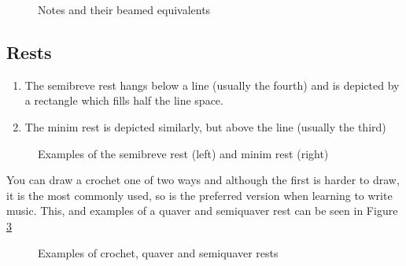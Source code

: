\begin{figure}[h!]
  \centering
  \caption{Notes and their beamed equivalents}
  \label{fig:RestCrochetQS}
\end{figure}


\subsection*{Rests}

\begin{enumerate}
\item The semibreve rest hangs below a line (usually the fourth) and is depicted by a rectangle which fills half the line space.
\item The minim rest is depicted similarly, but above the line (usually the third)
\end{enumerate}

\begin{figure}[h!]
  \centering
  \caption{Examples of the semibreve rest (left) and minim rest (right)}
  \label{fig:RestMinimSemibreve}
\end{figure}

You can draw a crochet one of two ways and although the first is harder to draw, it is the most commonly used, so is the preferred version when learning to write music. This, and examples of a quaver and semiquaver rest can be seen in Figure \ref{fig:RestCrochetQS}

\begin{figure}[h!]
  \centering
  \caption{Examples of crochet, quaver and semiquaver rests}
  \label{fig:RestCrochetQS}
\end{figure}

